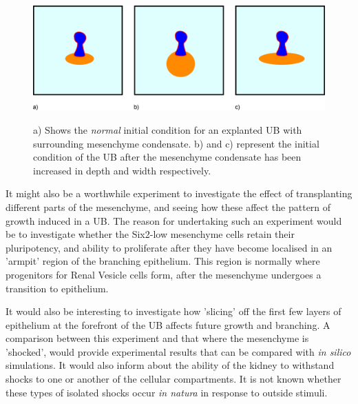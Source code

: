 \documentclass[pdftex,10pt,a4paper]{article}
\begin{document}
\begin{figure}[t] 
\centering
\scalebox{0.25} 
{\includegraphics{experiments_5.eps}}
\caption{a) Shows the \textit{normal} initial condition for an explanted UB with surrounding mesenchyme condensate. b) and c) represent the initial condition of the UB after the mesenchyme condensate has been increased in depth and width respectively.} \label{fig:mesthickness}
\end{figure} 

It might also be a worthwhile experiment to investigate the effect of transplanting different parts of the mesenchyme, and seeing how these affect the pattern of growth induced in a UB. The reason for undertaking such an experiment would be to investigate whether the Six2-low mesenchyme cells retain their pluripotency, and ability to proliferate after they have become localised in an 'armpit' region of the branching epithelium. This region is normally where progenitors for Renal Vesicle cells form, after the mesenchyme undergoes a transition to epithelium.

It would also be interesting to investigate how 'slicing' off the first few layers of epithelium at the forefront of the UB affects future growth and branching. A comparison between this experiment and that where the mesenchyme is 'shocked', would provide experimental results that can be compared with \textit{in silico} simulations. It would also inform about the ability of the kidney to withstand shocks to one or another of the cellular compartments. It is not known whether these types of isolated shocks occur \textit{in natura} in response to outside stimuli. 
\end{document}
